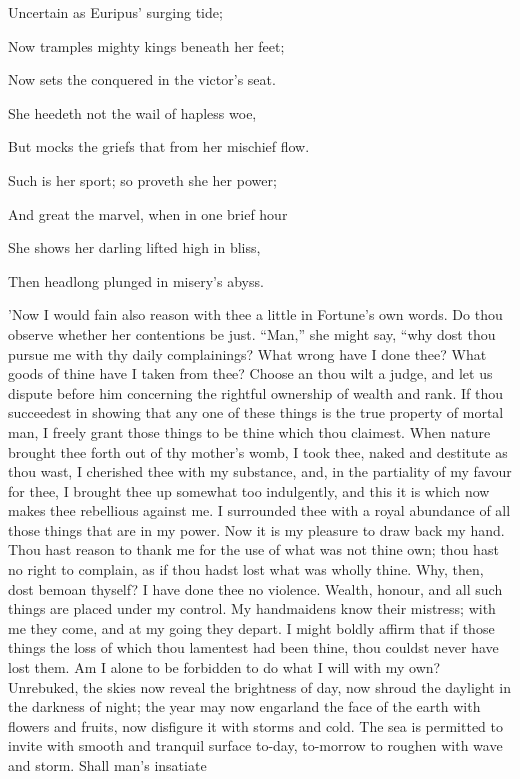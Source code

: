 Uncertain as Euripus' surging tide;

Now tramples mighty kings beneath her feet;

Now sets the conquered in the victor's seat.

She heedeth not the wail of hapless woe,

But mocks the griefs that from her mischief flow.

Such is her sport; so proveth she her power;

And great the marvel, when in one brief hour

She shows her darling lifted high in bliss,

Then headlong plunged in misery's abyss.


'Now I would fain also reason with thee a little in Fortune's own words.
Do thou observe whether her contentions be just. ``Man,'' she might say,
``why dost thou pursue me with thy daily complainings? What wrong have I
done thee? What goods of thine have I taken from thee? Choose an thou
wilt a judge, and let us dispute before him concerning the rightful
ownership of wealth and rank. If thou succeedest in showing that any one
of these things is the true property of mortal man, I freely grant those
things to be thine which thou claimest. When nature brought thee forth
out of thy mother's womb, I took thee, naked and destitute as thou wast,
I cherished thee with my substance, and, in the partiality of my favour
for thee, I brought thee up somewhat too indulgently, and this it is
which now makes thee rebellious against me. I surrounded thee with a
royal abundance of all those things that are in my power. Now it is my
pleasure to draw back my hand. Thou hast reason to thank me for the use
of what was not thine own; thou hast no right to complain, as if thou
hadst lost what was wholly thine. Why, then, dost bemoan thyself? I have
done thee no violence. Wealth, honour, and all such things are placed
under my control. My handmaidens know their mistress; with me they come,
and at my going they depart. I might boldly affirm that if those things
the loss of which thou lamentest had been thine, thou couldst never have
lost them. Am I alone to be forbidden to do what I will with my own?
Unrebuked, the skies now reveal the brightness of day, now shroud the
daylight in the darkness of night; the year may now engarland the face
of the earth with flowers and fruits, now disfigure it with storms and
cold. The sea is permitted to invite with smooth and tranquil surface
to-day, to-morrow to roughen with wave and storm. Shall man's insatiate
